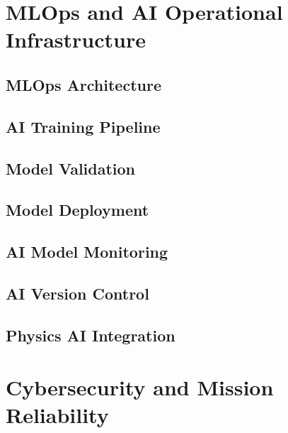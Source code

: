 \documentclass[11pt,a4paper,oneside]{report}
\begin{document}

\part{MLOps and AI Operational Infrastructure}


\chapter{MLOps Architecture}



\chapter{AI Training Pipeline}



\chapter{Model Validation}



\chapter{Model Deployment}



\chapter{AI Model Monitoring}



\chapter{AI Version Control}



\chapter{Physics AI Integration}



\part{Cybersecurity and Mission Reliability}
\end{document}
